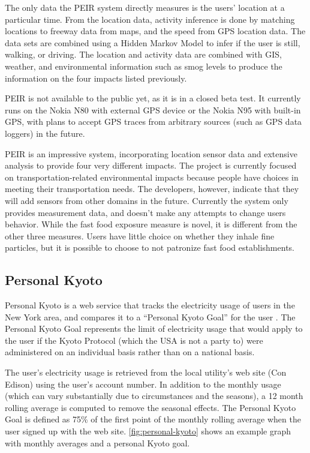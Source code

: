 The only data the PEIR system directly measures is the users' location at a particular time. From the location data, activity inference is done by matching locations to freeway data from maps, and the speed from GPS location data. The data sets are combined using a Hidden Markov Model to infer if the user is still, walking, or driving. The location and activity data are combined with GIS, weather, and environmental information such as smog levels to produce the information on the four impacts listed previously.

PEIR is not available to the public yet, as it is in a closed beta test. It currently runs on the Nokia N80 with external GPS device or the Nokia N95 with built-in GPS, with plans to accept GPS traces from arbitrary sources (such as GPS data loggers) in the future.

PEIR is an impressive system, incorporating location sensor data and extensive analysis to provide four very different impacts. The project is currently focused on transportation-related environmental impacts because people have  choices in meeting their transportation needs. The developers, however, indicate that they will add sensors from other domains in the future. Currently the system only provides measurement data, and doesn't make any attempts to change users behavior. While the fast food exposure measure is novel, it is different from the other three measures. Users have little choice on whether they inhale fine particles, but it is possible to choose to not patronize fast food establishments.

\subsection{Personal Kyoto}
\label{sec:personal-kyoto}

Personal Kyoto is a web service that tracks the electricity usage of users in the New York area, and compares it to a ``Personal Kyoto Goal'' for the user \cite{Personal-Kyoto-website}. The Personal Kyoto Goal represents the limit of electricity usage that would apply to the user if the Kyoto Protocol (which the USA is not a party to) were administered on an individual basis rather than on a national basis.

The user's electricity usage is retrieved from the local utility's web site (Con Edison) using the user's account number. In addition to the monthly usage (which can vary substantially due to circumstances and the seasons), a 12 month rolling average is computed to remove the seasonal effects. The Personal Kyoto Goal is defined as 75\% of the first point of the monthly rolling average when the user signed up with the web site. \autoref{fig:personal-kyoto} shows an example graph with monthly averages and a personal Kyoto goal.

